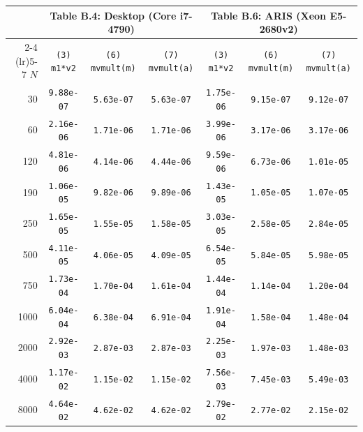 \begin{table}[htbp]
\centering
\scriptsize
\setlength{\tabcolsep}{4pt}
\begin{tabular}{r c c c @{\hspace{1.2em}} c c c}
\toprule
 & \multicolumn{3}{c}{\textbf{Table B.4: Desktop (Core i7-4790)}} & \multicolumn{3}{c}{\textbf{Table B.6: ARIS (Xeon E5-2680v2)}} \\
\cmidrule(lr){2-4} \cmidrule(lr){5-7}
$N$ & \texttt{(3) m1*v2} & \texttt{(6) mvmult(m)} & \texttt{(7) mvmult(a)} & \texttt{(3) m1*v2} & \texttt{(6) mvmult(m)} & \texttt{(7) mvmult(a)} \\
\midrule
30    & \texttt{9.88e-07} & \texttt{5.63e-07} & \texttt{5.63e-07} & \texttt{1.75e-06} & \texttt{9.15e-07} & \texttt{9.12e-07} \\
60    & \texttt{2.16e-06} & \texttt{1.71e-06} & \texttt{1.71e-06} & \texttt{3.99e-06} & \texttt{3.17e-06} & \texttt{3.17e-06} \\
120   & \texttt{4.81e-06} & \texttt{4.14e-06} & \texttt{4.44e-06} & \texttt{9.59e-06} & \texttt{6.73e-06} & \texttt{1.01e-05} \\
190   & \texttt{1.06e-05} & \texttt{9.82e-06} & \texttt{9.89e-06} & \texttt{1.43e-05} & \texttt{1.05e-05} & \texttt{1.07e-05} \\
250   & \texttt{1.65e-05} & \texttt{1.55e-05} & \texttt{1.58e-05} & \texttt{3.03e-05} & \texttt{2.58e-05} & \texttt{2.84e-05} \\
500   & \texttt{4.11e-05} & \texttt{4.06e-05} & \texttt{4.09e-05} & \texttt{6.54e-05} & \texttt{5.84e-05} & \texttt{5.98e-05} \\
750   & \texttt{1.73e-04} & \texttt{1.70e-04} & \texttt{1.61e-04} & \texttt{1.44e-04} & \texttt{1.14e-04} & \texttt{1.20e-04} \\
1000  & \texttt{6.04e-04} & \texttt{6.38e-04} & \texttt{6.91e-04} & \texttt{1.91e-04} & \texttt{1.58e-04} & \texttt{1.48e-04} \\
2000  & \texttt{2.92e-03} & \texttt{2.87e-03} & \texttt{2.87e-03} & \texttt{2.25e-03} & \texttt{1.97e-03} & \texttt{1.48e-03} \\
4000  & \texttt{1.17e-02} & \texttt{1.15e-02} & \texttt{1.15e-02} & \texttt{7.56e-03} & \texttt{7.45e-03} & \texttt{5.49e-03} \\
8000  & \texttt{4.64e-02} & \texttt{4.62e-02} & \texttt{4.62e-02} & \texttt{2.79e-02} & \texttt{2.77e-02} & \texttt{2.15e-02} \\

\end{tabular}
\end{table}
